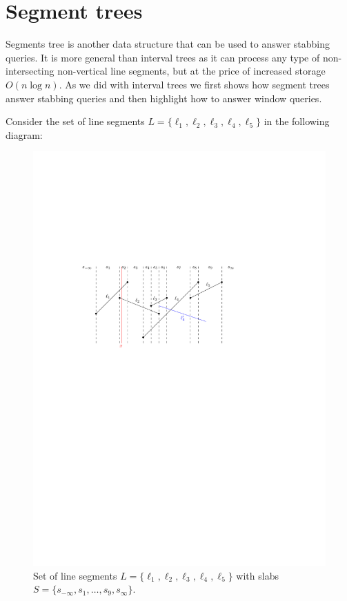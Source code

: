 \section{Segment trees}
\label{sec:segmenet-trees}

Segments tree is another data structure that can be used to answer stabbing queries.
%
It is more general than interval trees as it can process any type of non-intersecting non-vertical line segments, but at the price of increased storage $O(n \log n)$.
%
As we did with interval trees we first shows how segment trees answer stabbing queries and then highlight how to answer window queries.
%

Consider the set of line segments $L = \{ \ell_1, \ell_2, \ell_3, \ell_4, \ell_5\}$ in the following diagram: 

\begin{figure}[h!]
\centering
\includegraphics[scale = .8]{ipe/slanted-lines.pdf}
\caption{Set of line segments $L = \{ \ell_1, \ell_2, \ell_3, \ell_4, \ell_5\}$ with slabs $S = \{s_{-\infty},s_1, \dots, s_9, s_{\infty} \}$.}
\label{fig:slanted-lines}
\end{figure}
